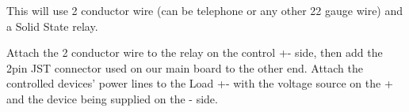 This will use 2 conductor wire (can be telephone or any other 22 gauge wire) and a Solid State relay.

Attach the 2 conductor wire to the relay on the control +- side, then add the 2pin JST connector used on our main board to the other end. Attach the controlled devices' power lines to the Load +- with the voltage source on the + and the device being supplied on the - side. 